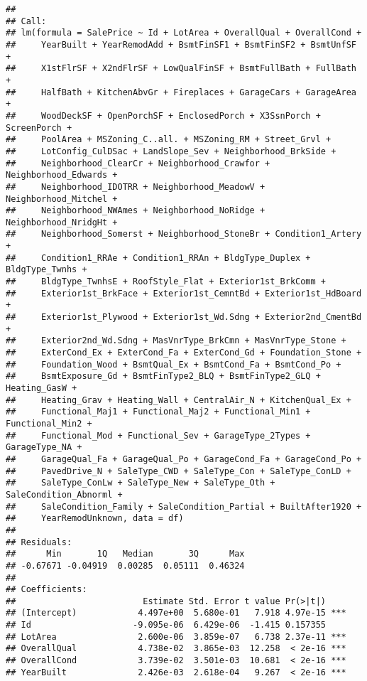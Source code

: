 \documentclass[
]{article}
\begin{document}
\begin{verbatim}
## 
## Call:
## lm(formula = SalePrice ~ Id + LotArea + OverallQual + OverallCond + 
##     YearBuilt + YearRemodAdd + BsmtFinSF1 + BsmtFinSF2 + BsmtUnfSF + 
##     X1stFlrSF + X2ndFlrSF + LowQualFinSF + BsmtFullBath + FullBath + 
##     HalfBath + KitchenAbvGr + Fireplaces + GarageCars + GarageArea + 
##     WoodDeckSF + OpenPorchSF + EnclosedPorch + X3SsnPorch + ScreenPorch + 
##     PoolArea + MSZoning_C..all. + MSZoning_RM + Street_Grvl + 
##     LotConfig_CulDSac + LandSlope_Sev + Neighborhood_BrkSide + 
##     Neighborhood_ClearCr + Neighborhood_Crawfor + Neighborhood_Edwards + 
##     Neighborhood_IDOTRR + Neighborhood_MeadowV + Neighborhood_Mitchel + 
##     Neighborhood_NWAmes + Neighborhood_NoRidge + Neighborhood_NridgHt + 
##     Neighborhood_Somerst + Neighborhood_StoneBr + Condition1_Artery + 
##     Condition1_RRAe + Condition1_RRAn + BldgType_Duplex + BldgType_Twnhs + 
##     BldgType_TwnhsE + RoofStyle_Flat + Exterior1st_BrkComm + 
##     Exterior1st_BrkFace + Exterior1st_CemntBd + Exterior1st_HdBoard + 
##     Exterior1st_Plywood + Exterior1st_Wd.Sdng + Exterior2nd_CmentBd + 
##     Exterior2nd_Wd.Sdng + MasVnrType_BrkCmn + MasVnrType_Stone + 
##     ExterCond_Ex + ExterCond_Fa + ExterCond_Gd + Foundation_Stone + 
##     Foundation_Wood + BsmtQual_Ex + BsmtCond_Fa + BsmtCond_Po + 
##     BsmtExposure_Gd + BsmtFinType2_BLQ + BsmtFinType2_GLQ + Heating_GasW + 
##     Heating_Grav + Heating_Wall + CentralAir_N + KitchenQual_Ex + 
##     Functional_Maj1 + Functional_Maj2 + Functional_Min1 + Functional_Min2 + 
##     Functional_Mod + Functional_Sev + GarageType_2Types + GarageType_NA + 
##     GarageQual_Fa + GarageQual_Po + GarageCond_Fa + GarageCond_Po + 
##     PavedDrive_N + SaleType_CWD + SaleType_Con + SaleType_ConLD + 
##     SaleType_ConLw + SaleType_New + SaleType_Oth + SaleCondition_Abnorml + 
##     SaleCondition_Family + SaleCondition_Partial + BuiltAfter1920 + 
##     YearRemodUnknown, data = df)
## 
## Residuals:
##      Min       1Q   Median       3Q      Max 
## -0.67671 -0.04919  0.00285  0.05111  0.46324 
## 
## Coefficients:
##                         Estimate Std. Error t value Pr(>|t|)    
## (Intercept)            4.497e+00  5.680e-01   7.918 4.97e-15 ***
## Id                    -9.095e-06  6.429e-06  -1.415 0.157355    
## LotArea                2.600e-06  3.859e-07   6.738 2.37e-11 ***
## OverallQual            4.738e-02  3.865e-03  12.258  < 2e-16 ***
## OverallCond            3.739e-02  3.501e-03  10.681  < 2e-16 ***
## YearBuilt              2.426e-03  2.618e-04   9.267  < 2e-16 ***

\end{verbatim}
\end{document}
